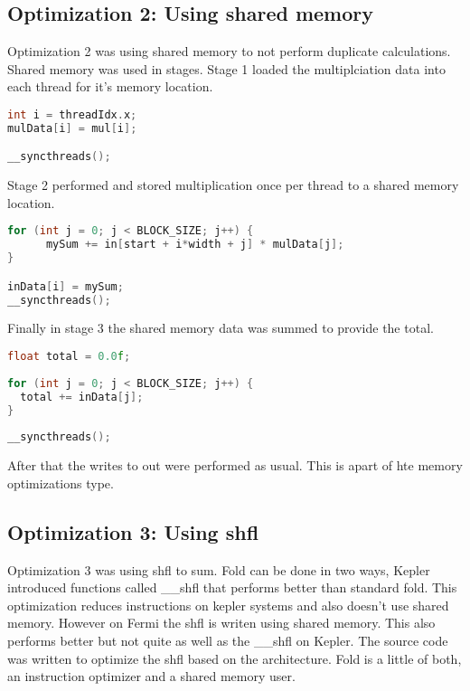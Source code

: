 \documentclass{article}
\begin{document}
  \subsection{Optimization 2: Using shared memory}
  Optimization 2 was using shared memory to not perform duplicate calculations.
  Shared memory was used in stages. Stage 1 loaded the multiplciation data into
  each thread for it's memory location.

  \begin{lstlisting}[language=C++,breaklines=true,caption='Stage 1 of Shared Memory',basicstyle=\footnotesize]
int i = threadIdx.x;
mulData[i] = mul[i];

__syncthreads();
  \end{lstlisting}

  Stage 2 performed and stored multiplication once per thread to a shared memory
  location.

  \begin{lstlisting}[language=C++,breaklines=true,caption='Stage 2 of Share Memory',basicstyle=\footnotesize]
for (int j = 0; j < BLOCK_SIZE; j++) {
      mySum += in[start + i*width + j] * mulData[j];
}

inData[i] = mySum;
__syncthreads();
  \end{lstlisting}
  
  Finally in stage 3 the shared memory data was summed to provide the total.

  \begin{lstlisting}[language=C++,breaklines=true,caption='Stage 3 of Shared Memory',basicstyle=\footnotesize]
float total = 0.0f;  
	
for (int j = 0; j < BLOCK_SIZE; j++) { 
  total += inData[j]; 
}
    
__syncthreads();
  \end{lstlisting}

  After that the writes to out were performed as usual. This is apart of hte
  memory optimizations type.


  \subsection{Optimization 3: Using shfl}
  Optimization 3 was using shfl to sum. Fold can be done in two ways, Kepler
  introduced functions called \_\_shfl that performs better than standard fold.
  This optimization reduces instructions on kepler systems and also doesn't use
  shared memory. However on Fermi the shfl is writen using shared memory. This
  also performs better but not quite as well as the \_\_shfl on Kepler. The source
  code was written to optimize the shfl based on the architecture. Fold is a
  little of both, an instruction optimizer and a shared memory user.
\end{document}
